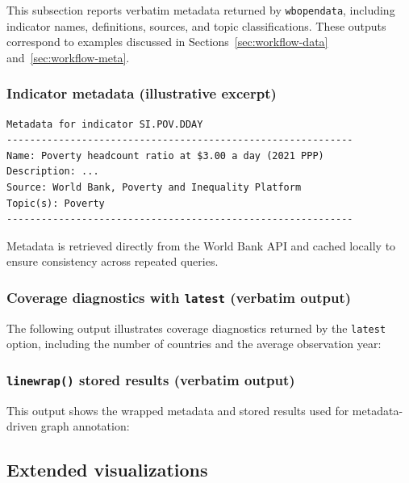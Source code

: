 \documentclass[bib]{statapress}
\begin{document}
This subsection reports verbatim metadata returned by \texttt{wbopendata},
including indicator names, definitions, sources, and topic classifications.
These outputs correspond to examples discussed in Sections~\ref{sec:workflow-data} and~\ref{sec:workflow-meta}.

\subsubsection{Indicator metadata (illustrative excerpt)}
\begin{verbatim}
Metadata for indicator SI.POV.DDAY
------------------------------------------------------------
Name: Poverty headcount ratio at $3.00 a day (2021 PPP)
Description: ...
Source: World Bank, Poverty and Inequality Platform
Topic(s): Poverty
------------------------------------------------------------
\end{verbatim}

Metadata is retrieved directly from the World Bank API and cached locally to
ensure consistency across repeated queries.

\subsubsection{Coverage diagnostics with \texttt{latest} (verbatim output)}
The following output illustrates coverage diagnostics returned by the
\texttt{latest} option, including the number of countries and the average
observation year:
\begin{stlog}
\nullskip
\end{stlog}

\subsubsection{\texttt{linewrap()} stored results (verbatim output)}
This output shows the wrapped metadata and stored results used for
metadata-driven graph annotation:
\begin{stlog}
\nullskip
\end{stlog}

\subsection{Extended visualizations}\label{app:examples:viz}
\end{document}
